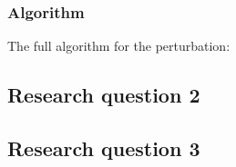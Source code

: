 \subsubsection{Algorithm}
The full algorithm for the perturbation:


\subsection{Research question 2}
\subsection{Research question 3}
